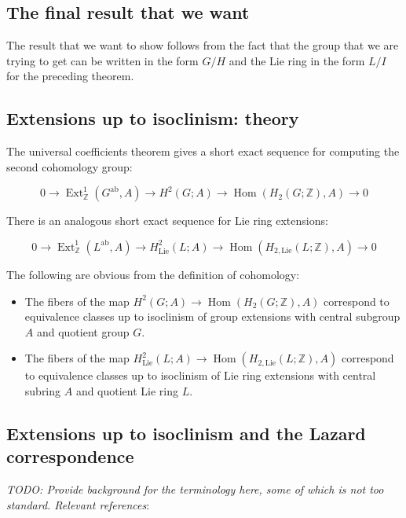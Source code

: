 \subsection{The final result that we want}

The result that we want to show follows from the fact that the group
that we are trying to get can be written in the form $G/H$ and the Lie
ring in the form $L/I$ for the preceding theorem.

\newpage

\subsection{Extensions up to isoclinism: theory}

The universal coefficients theorem gives a short exact sequence for
computing the second cohomology group:

$$0 \to \operatorname{Ext}^1_{\mathbb{Z}}(G^{\text{ab}},A) \to H^2(G;A) \to \operatorname{Hom}(H_2(G;\mathbb{Z}),A) \to 0$$

There is an analogous short exact sequence for Lie ring extensions:

$$0 \to \operatorname{Ext}^1_{\mathbb{Z}}(L^{\text{ab}},A) \to H^2_{\text{Lie}}(L;A) \to \operatorname{Hom}(H_{2,\text{Lie}}(L;\mathbb{Z}),A) \to 0$$

The following are obvious from the definition of cohomology: 

\begin{itemize}
\item The fibers of the map $H^2(G;A) \to
  \operatorname{Hom}(H_2(G;\mathbb{Z}),A)$ correspond to equivalence
  classes up to isoclinism of group extensions with central subgroup
  $A$ and quotient group $G$.
\item The fibers of the map $H^2_{\text{Lie}}(L;A) \to
  \operatorname{Hom}(H_{2,\text{Lie}}(L;\mathbb{Z}),A)$ correspond to
  equivalence classes up to isoclinism of Lie ring extensions with
  central subring $A$ and quotient Lie ring $L$.
\end{itemize}

\subsection{Extensions up to isoclinism and the Lazard correspondence}

{\em TODO: Provide background for the terminology here, some of which
is not too standard. Relevant references}:

